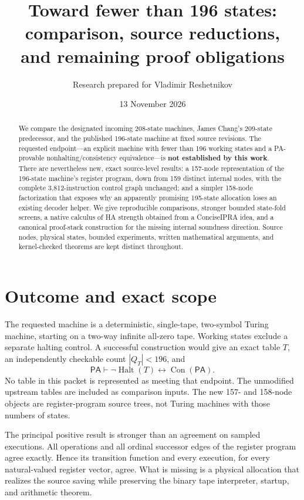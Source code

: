 \documentclass[11pt,letterpaper]{article}
\title{Toward fewer than 196 states:\\comparison, source reductions,\\and remaining proof obligations}
\author{Research prepared for Vladimir Reshetnikov}
\date{13 November 2026}
\newcommand{\PA}{\mathsf{PA}}
\newcommand{\Con}{\operatorname{Con}}
\newcommand{\Halt}{\operatorname{Halt}}
\begin{document}
\maketitle
\begin{abstract}
We compare the designated incoming 208-state machines, James Chang's
209-state predecessor, and the published 196-state machine at fixed source
revisions. The requested endpoint---an explicit machine with fewer than
196 working states and a PA-provable nonhalting/consistency equivalence---is
\textbf{not established by this work}. There are nevertheless new, exact
source-level results: a 157-node representation of the 196-state machine's
register program, down from 159 distinct internal nodes, with the complete
3,812-instruction control graph unchanged; and a simpler 158-node
factorization that exposes why an apparently promising 195-state allocation
loses an existing decoder helper. We give reproducible comparisons, stronger
bounded state-fold screens, a native calculus of HA strength obtained from a
ConciseIPRA idea, and a canonical proof-stack construction for the missing
internal soundness direction. Source nodes, physical states, bounded
experiments, written mathematical arguments, and kernel-checked theorems are
kept distinct throughout.
\end{abstract}

\section{Outcome and exact scope}

The requested machine is a deterministic, single-tape, two-symbol Turing
machine, starting on a two-way infinite all-zero tape. Working states exclude
a separate halting control. A successful construction would give an exact
table $T$, an independently checkable count $|Q_T|<196$, and
\[
 \PA\vdash \neg\Halt(T)\leftrightarrow\Con(\PA).
\]
No table in this packet is represented as meeting that endpoint. The
unmodified upstream tables are included as comparison inputs. The new
157- and 158-node objects are register-program source trees, not Turing
machines with those numbers of states.

The principal positive result is stronger than an agreement on sampled
executions. All operations and all ordinal successor edges of the register
program agree exactly. Hence its transition function and every execution,
for every natural-valued register vector, agree. What is missing is a
physical allocation that realizes the source saving while preserving the
binary tape interpreter, startup, and arithmetic theorem.
\end{document}
